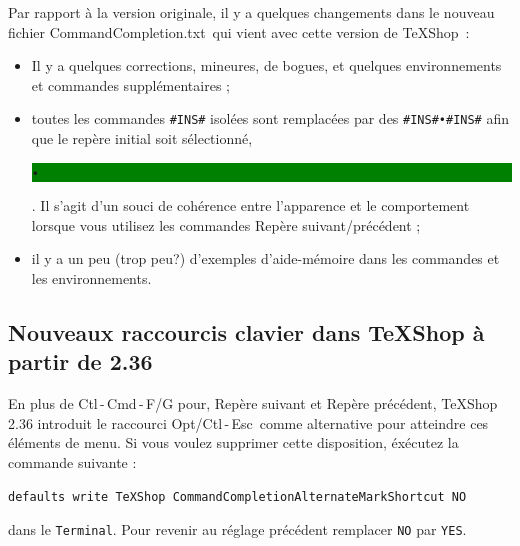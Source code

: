 \documentclass[11pt,french]{article}
\newcommand{\optkey}{\textsf{Opt}}
\newcommand{\ctlkey}{\textsf{Ctl}}
\newcommand{\cmdkey}{\textsf{Cmd}}
\newcommand{\esckey}{\textsf{Esc}}
\newcommand{\mnu}[1]{\textsf{#1}}
\newcommand{\selmark}{\colorbox{green}{\rule[-0.5ex]{0ex}{2.1ex}\texttt{•}}}
\newcommand{\TS}{\textsf{\TeX Shop}}
\newcommand{\CCT}{\textsf{CommandCompletion.txt}}
\begin{document}
Par rapport à la version originale, il y a quelques changements dans le nouveau fichier \CCT\ qui vient avec cette version de \TS\ :
\begin{itemize}
\item Il y a quelques corrections, mineures, de bogues, et quelques environnements et commandes supplémentaires ;
\item toutes les commandes \verb|#INS#| isolées sont remplacées par des \verb|#INS#•#INS#| afin que 
le repère initial soit sélectionné, \selmark. Il s'agit d'un souci de cohérence entre l'apparence et le comportement 
lorsque vous utilisez les commandes \mnu{Repère suivant/précédent} ;
\item il y a un peu (trop peu?) d'exemples d'aide-mémoire dans les commandes et les environnements.
\end{itemize}


\subsection*{Nouveaux raccourcis clavier dans \TS{} à partir de 2.36}

En plus de \ctlkey\,-\,\cmdkey\,-\,\textsf{F/G} pour, \mnu{Repère suivant} et \mnu{Repère précédent}, \TS{} 2.36 introduit le raccourci \optkey/\ctlkey\,-\,\esckey\ comme alternative pour atteindre ces éléments de menu. Si vous voulez supprimer cette disposition, éxécutez la commande suivante :
\begin{verbatim}
defaults write TeXShop CommandCompletionAlternateMarkShortcut NO
\end{verbatim}
dans le \texttt{Terminal}. Pour revenir au réglage précédent remplacer \texttt{NO} par \texttt{YES}.  
\end{document}
